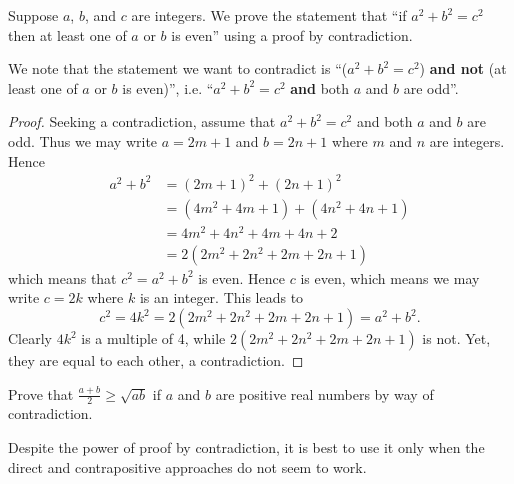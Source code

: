 \begin{example}
    \setlength{\parindent}{1.5em}

    Suppose $a$, $b$, and $c$ are integers. We prove the statement that ``if $a^2 + b^2 = c^2$ then at least one of $a$ or $b$ is even'' using a proof by contradiction.

    We note that the statement we want to contradict is ``($a^2 + b^2 = c^2$) \textbf{and not} (at least one of $a$ or $b$ is even)'', i.e. ``$a^2 + b^2 = c^2$ \textbf{and} both $a$ and $b$ are odd''.
    \begin{proof}
        Seeking a contradiction, assume that $a^2 + b^2 = c^2$ and both $a$ and $b$ are odd. Thus we may write $a = 2m + 1$ and $b = 2n + 1$ where $m$ and $n$ are integers. Hence
        \begin{align*}
            a^2 + b^2 &= (2m+1)^2 + (2n+1)^2\\
            &= (4m^2+4m+1) + (4n^2+4n+1)\\
            &= 4m^2 + 4n^2 + 4m + 4n + 2\\
            &= 2(2m^2 + 2n^2 + 2m + 2n +1)
        \end{align*}
        which means that $c^2 = a^2 + b^2$ is even. Hence $c$ is even, which means we may write $c = 2k$ where $k$ is an integer. This leads to
        \[
            c^2 = 4k^2 = 2(2m^2 + 2n^2 + 2m + 2n + 1) = a^2 + b^2.
        \]
        Clearly $4k^2$ is a multiple of 4, while $2(2m^2 + 2n^2 + 2m + 2n + 1)$ is not. Yet, they are equal to each other, a contradiction.
    \end{proof}
\end{example}

\begin{exercise}
    Prove that $\frac{a+b}{2} \geq \sqrt{ab}$ if $a$ and $b$ are positive real numbers by way of contradiction.
\end{exercise}

Despite the power of proof by contradiction, it is best to use it only when the direct and contrapositive approaches do not seem to work.

